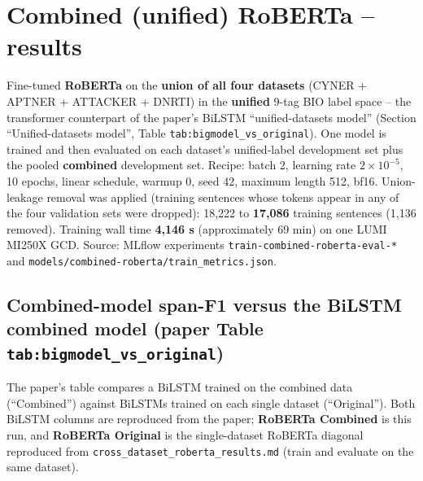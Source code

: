 \section*{Combined (unified) RoBERTa -- results}

Fine-tuned \textbf{RoBERTa} on the \textbf{union of all four datasets} (CYNER + APTNER + ATTACKER + DNRTI) in the \textbf{unified} 9-tag BIO label space -- the transformer counterpart of the paper's BiLSTM ``unified-datasets model'' (Section ``Unified-datasets model'', Table \texttt{tab:bigmodel\_vs\_original}). One model is trained and then evaluated on each dataset's unified-label development set plus the pooled \textbf{combined} development set. Recipe: batch 2, learning rate $2\times10^{-5}$, 10 epochs, linear schedule, warmup 0, seed 42, maximum length 512, bf16. Union-leakage removal was applied (training sentences whose tokens appear in any of the four validation sets were dropped): 18,222 to \textbf{17,086} training sentences (1,136 removed). Training wall time \textbf{4,146 s} (approximately 69 min) on one LUMI MI250X GCD. Source: MLflow experiments \texttt{train-combined-roberta-eval-*} and \texttt{models/combined-roberta/train\_metrics.json}.

\subsection*{Combined-model span-F1 versus the BiLSTM combined model (paper Table \texttt{tab:bigmodel\_vs\_original})}

The paper's table compares a BiLSTM trained on the combined data (``Combined'') against BiLSTMs trained on each single dataset (``Original''). Both BiLSTM columns are reproduced from the paper; \textbf{RoBERTa Combined} is this run, and \textbf{RoBERTa Original} is the single-dataset RoBERTa diagonal reproduced from \texttt{cross\_dataset\_roberta\_results.md} (train and evaluate on the same dataset).

\begin{table}[h!]
\centering
{}%
\caption{Span-F1 on development datasets given models trained on combined or original datasets.}
\label{tab:bigmodel_vs_original}
\end{table}

